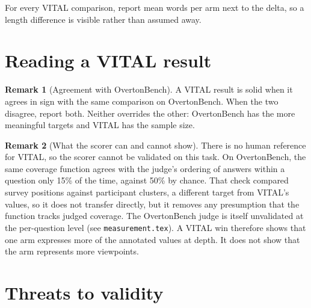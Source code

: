 \documentclass[11pt]{article}
\theoremstyle{definition}
\newtheorem{remark}{Remark}
\newcommand{\1}{\mathbf{1}}
\begin{document}
\noindent
For every VITAL comparison, report mean words per arm next to the delta, so a
length difference is visible rather than assumed away.

\section{Reading a VITAL result}

\begin{remark}[Agreement with OvertonBench]
A VITAL result is solid when it agrees in sign with the same comparison on
OvertonBench. When the two disagree, report both. Neither overrides the other:
OvertonBench has the more meaningful targets and VITAL has the sample size.
\end{remark}

\begin{remark}[What the scorer can and cannot show]\label{rem:scorer}
There is no human reference for VITAL, so the scorer cannot be validated on this
task. On OvertonBench, the same coverage function agrees with the judge's ordering
of answers within a question only 15\% of the time, against 50\% by chance. That
check compared survey positions against participant clusters, a different target
from VITAL's values, so it does not transfer directly, but it removes any
presumption that the function tracks judged coverage. The OvertonBench judge is
itself unvalidated at the per-question level (see \texttt{measurement.tex}). A
VITAL win therefore shows that one arm expresses more of the annotated values at
depth. It does not show that the arm represents more viewpoints.
\end{remark}

\section{Threats to validity}
\end{document}
